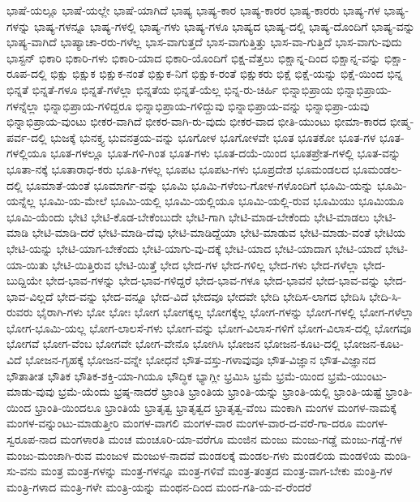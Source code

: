 {ಭಾಷೆ-ಯಲ್ಲೂ
ಭಾಷೆ-ಯಲ್ಲೇ
ಭಾಷೆ-ಯಾಗಿದೆ
ಭಾಷ್ಯ
ಭಾಷ್ಯ-ಕಾರ
ಭಾಷ್ಯ-ಕಾರರ
ಭಾಷ್ಯ-ಕಾರರು
ಭಾಷ್ಯ-ಗಳ
ಭಾಷ್ಯ-ಗಳನ್ನು
ಭಾಷ್ಯ-ಗಳನ್ನೂ
ಭಾಷ್ಯ-ಗಳಲ್ಲಿ
ಭಾಷ್ಯ-ಗಳು
ಭಾಷ್ಯ-ಗಳೂ
ಭಾಷ್ಯದ
ಭಾಷ್ಯ-ದಲ್ಲಿ
ಭಾಷ್ಯ-ದೊಂದಿಗೆ
ಭಾಷ್ಯ-ವನ್ನು
ಭಾಷ್ಯ-ವಾಗಿದೆ
ಭಾಷ್ಯಾಚಾ-ರರು-ಗಳೆಲ್ಲ
ಭಾಸ-ವಾಗುತ್ತದೆ
ಭಾಸ-ವಾಗುತ್ತಿತ್ತು
ಭಾಸ-ವಾ-ಗುತ್ತಿದೆ
ಭಾಸ-ವಾಗು-ವುದು
ಭಾಸ್ಟನ್
ಭಿಕಾರಿ
ಭಿಕಾರಿ-ಗಳು
ಭಿಕಾರಿ-ಯಾದ
ಭಿಕಾರಿ-ಯೊಂದಿಗೆ
ಭಿಕ್ಷ-ವೆತ್ತಲು
ಭಿಕ್ಷಾನ್ನ-ದಿಂದ
ಭಿಕ್ಷಾನ್ನ-ವನ್ನು
ಭಿಕ್ಷಾ-ರೂಪ-ದಲ್ಲಿ
ಭಿಕ್ಷು
ಭಿಕ್ಷುಕ
ಭಿಕ್ಷುಕ-ನಂತೆ
ಭಿಕ್ಷುಕ-ನಿಗೆ
ಭಿಕ್ಷುಕ-ರಂತೆ
ಭಿಕ್ಷುಕರು
ಭಿಕ್ಷೆ
ಭಿಕ್ಷೆ-ಯನ್ನು
ಭಿಕ್ಷೆ-ಯಿಂದ
ಭಿನ್ನ
ಭಿನ್ನತೆ
ಭಿನ್ನತೆ-ಗಳೂ
ಭಿನ್ನತೆ-ಗಳೆಲ್ಲಾ
ಭಿನ್ನತೆಯ
ಭಿನ್ನತೆ-ಯೆಲ್ಲ
ಭಿನ್ನ-ರು-ಚಿರ್ಹಿ
ಭಿನ್ನಾಭಿಪ್ರಾಯ
ಭಿನ್ನಾಭಿಪ್ರಾಯ-ಗಳನ್ನೆಲ್ಲಾ
ಭಿನ್ನಾಭಿಪ್ರಾಯ-ಗಳಿದ್ದರೂ
ಭಿನ್ನಾಭಿಪ್ರಾಯ-ಗಳಿದ್ದುವು
ಭಿನ್ನಾಭಿಪ್ರಾಯ-ವನ್ನು
ಭಿನ್ನಾಭಿಪ್ರಾ-ಯವು
ಭಿನ್ನಾಭಿಪ್ರಾಯ-ವುಂಟು
ಭೀಕರ-ವಾಗಿದೆ
ಭೀಕರ-ವಾಗಿ-ರು-ವುದು
ಭೀಕರ-ವಾದ
ಭೀತಿ-ಯುಂಟು
ಭೀಮಾ-ಕಾರದ
ಭೀಷ್ಮ-ಪರ್ವ-ದಲ್ಲಿ
ಭುಜಕ್ಕೆ
ಭುನಕ್ತ್ಯ
ಭುವನತ್ರಯ-ವನ್ನು
ಭೂಗೋಳ
ಭೂಗೋಳವೇ
ಭೂತ
ಭೂತಕೋ
ಭೂತ-ಗಳ
ಭೂತ-ಗಳಲ್ಲಿಯೂ
ಭೂತ-ಗಳಲ್ಲೂ
ಭೂತ-ಗಳಿ-ಗಿಂತ
ಭೂತ-ಗಳು
ಭೂತ-ದಯೆ-ಯಿಂದ
ಭೂತಪ್ರೇತ-ಗಳಲ್ಲಿ
ಭೂತ-ವನ್ನು
ಭೂತಾ-ನಕ್ಕೆ
ಭೂತಾರಾಧ-ಕರು
ಭೂತಿ-ಗಳಲ್ಲ
ಭೂಪಟ
ಭೂಪಟ-ಗಳು
ಭೂಪ್ರದೇಶ
ಭೂಮಂಡಲದ
ಭೂಮಂಡಲ-ದಲ್ಲಿ
ಭೂಮಾತೆ-ಯಂತೆ
ಭೂಮಾರ್ಗ-ವನ್ನು
ಭೂಮಿ
ಭೂಮಿ-ಗಳೆಂಬ-ಗೋಳ-ಗಳೊಂದಿಗೆ
ಭೂಮಿ-ಯನ್ನು
ಭೂಮಿ-ಯನ್ನೆಲ್ಲ
ಭೂಮಿ-ಯ-ಮೇಲೆ
ಭೂಮಿ-ಯಲ್ಲಿ
ಭೂಮಿ-ಯಲ್ಲಿಯೂ
ಭೂಮಿ-ಯಲ್ಲಿ-ರುವ
ಭೂಮಿಯು
ಭೂಮಿಯೂ
ಭೂಮಿ-ಯೆಂದು
ಭೇಟಿ
ಭೇಟಿ-ಕೊಡ-ಬೇಕೆಂಬುದೇ
ಭೇಟಿ-ಗಾಗಿ
ಭೇಟಿ-ಮಾಡ-ಬೇಕೆಂದು
ಭೇಟಿ-ಮಾಡಲು
ಭೇಟಿ-ಮಾಡಿ
ಭೇಟಿ-ಮಾಡಿ-ದರೆ
ಭೇಟಿ-ಮಾಡಿ-ದೆವು
ಭೇಟಿ-ಮಾಡಿದ್ದೆಯಾ
ಭೇಟಿ-ಮಾಡುವ
ಭೇಟಿ-ಮಾಡು-ವಂತೆ
ಭೇಟಿಯ
ಭೇಟಿ-ಯನ್ನು
ಭೇಟಿ-ಯಾಗ-ಬೇಕೆಂದು
ಭೇಟಿ-ಯಾಗು-ವು-ದಕ್ಕೆ
ಭೇಟಿ-ಯಾದ
ಭೇಟಿ-ಯಾದಾಗ
ಭೇಟಿ-ಯಾದೆ
ಭೇಟಿ-ಯಾ-ಯಿತು
ಭೇಟಿ-ಯಿತ್ತಿರುವ
ಭೇಟಿ-ಯಿತ್ತೆ
ಭೇದ
ಭೇದ-ಗಳ
ಭೇದ-ಗಳಿಲ್ಲ
ಭೇದ-ಗಳು
ಭೇದ-ಗಳೆಲ್ಲಾ
ಭೇದ-ಬುದ್ದಿಯೇ
ಭೇದ-ಭಾವ-ಗಳನ್ನು
ಭೇದ-ಭಾವ-ಗಳಿದ್ದರೆ
ಭೇದ-ಭಾವ-ಗಳೂ
ಭೇದ-ಭಾವನೆ
ಭೇದ-ಭಾವ-ವನ್ನು
ಭೇದ-ಭಾವ-ವಿಲ್ಲದೆ
ಭೇದ-ವನ್ನು
ಭೇದ-ವನ್ನೂ
ಭೇದ-ವಿದೆ
ಭೇದವೂ
ಭೇದವೇ
ಭೇದಿ
ಭೇದಿಸ-ಲಾಗದ
ಭೇದಿಸಿ
ಭೇದಿ-ಸಿ-ರುವರು
ಭೈರಾಗಿ-ಗಳು
ಭೋ
ಭೋಃ
ಭೋಗ
ಭೋಗಕ್ಕಲ್ಲ
ಭೋಗಕ್ಕೆಲ್ಲ
ಭೋಗ-ಗಳನ್ನು
ಭೋಗ-ಗಳಲ್ಲಿ
ಭೋಗ-ಗಳೆಲ್ಲಾ
ಭೋಗ-ಭೂಮಿ-ಯಲ್ಲ
ಭೋಗ-ಲಾಲಸೆ-ಗಳು
ಭೋಗ-ವನ್ನು
ಭೋಗ-ವಿಲಾಸ-ಗಳಿಗೆ
ಭೋಗ-ವಿಲಾಸ-ದಲ್ಲಿ
ಭೋಗವೂ
ಭೋಗವೆ
ಭೋಗ-ವೆಂಬ
ಭೋಗವೇ
ಭೋಗ-ವೇನೊ
ಭೋಗಿಸಿ
ಭೋಜನ
ಭೋಜನ-ಕೂಟ-ದಲ್ಲಿ
ಭೋಜನ-ಕೂಟ-ವಿದೆ
ಭೋಜನ-ಗೃಹಕ್ಕೆ
ಭೋಜನ-ವನ್ನೇ
ಭೋಧನೆ
ಭೌತ-ವಸ್ತು-ಗಳಾವುವೂ
ಭೌತ-ವಿಜ್ಞಾನ
ಭೌತ-ವಿಜ್ಞಾನದ
ಭೌತಾತೀತ
ಭೌತಿಕ
ಭೌತಿಕ-ಶಕ್ತಿ-ಯಾ-ಗಿಯೂ
ಭೌದ್ಧಿಕ
ಭ್ಯಾಗ್ಲೀ
ಭ್ರಮಿಸಿ
ಭ್ರಮೆ
ಭ್ರಮೆ-ಯಿಂದ
ಭ್ರಮೆ-ಯುಂಟು-ಮಾಡು-ವುವು
ಭ್ರಮೆ-ಯೆಂದು
ಭ್ರಷ್ಠ-ನಾದರೆ
ಭ್ರಾಂತಿ
ಭ್ರಾಂತಿಯ
ಭ್ರಾಂತಿ-ಯನ್ನು
ಭ್ರಾಂತಿ-ಯಲ್ಲಿ
ಭ್ರಾಂತಿ-ಯಷ್ಟೆ
ಭ್ರಾಂತಿ-ಯಿಂದ
ಭ್ರಾಂತಿ-ಯಿಂದಲೂ
ಭ್ರಾಂತಿಯೆ
ಭ್ರಾತೃತ್ವ
ಭ್ರಾತೃತ್ವದ
ಭ್ರಾತೃತ್ವ-ವೆಂಬ
ಮಂಕಾಗಿ
ಮಂಗಳ
ಮಂಗಳ-ನಾಮಕ್ಕೆ
ಮಂಗಳ-ವನ್ನುಂಟು-ಮಾಡುತ್ತೀರಿ
ಮಂಗಳ-ವಾಗಲಿ
ಮಂಗಳ-ವಾರ
ಮಂಗಳ-ವಾರ-ದ-ವರೆ-ಗಾ-ದರೂ
ಮಂಗಳ-ಸ್ವರೂಪ-ನಾದ
ಮಂಗಳಾರತಿ
ಮಂಚ
ಮಂಚೂರಿ-ಯಾ-ವರೆಗೂ
ಮಂಜಿನ
ಮಂಜು
ಮಂಜು-ಗಡ್ಡೆ
ಮಂಜು-ಗಡ್ಡೆ-ಗಳ
ಮಂಜು-ಮಂಜಾಗಿ-ರುವ
ಮಂಜುಳ
ಮಂಜುಳ-ನಾದವೆ
ಮಂಡಲಕ್ಕೆ
ಮಂಡಲ-ಗಳು
ಮಂಡಲಿಯ
ಮಂಡಳಿಯ
ಮಂಡಿ-ಸು-ವನು
ಮಂತ್ರ
ಮಂತ್ರ-ಗಳನ್ನು
ಮಂತ್ರ-ಗಳನ್ನೂ
ಮಂತ್ರ-ಗಳಿವೆ
ಮಂತ್ರ-ತಂತ್ರದ
ಮಂತ್ರ-ವಾಗ-ಬೇಕು
ಮಂತ್ರಿ-ಗಳ
ಮಂತ್ರಿ-ಗಳಾದ
ಮಂತ್ರಿ-ಗಳೇ
ಮಂತ್ರಿ-ಯನ್ನು
ಮಂಥನ-ದಿಂದ
ಮಂದ-ಗತಿ-ಯ-ವ-ರೆಂದರೆ
}
